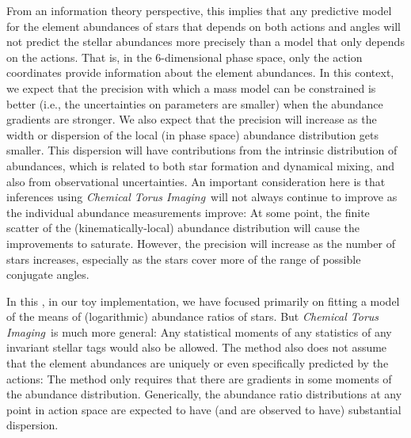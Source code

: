 \documentclass[modern]{aastex63}
\newcommand{\methodname}{\textsl{Chemical Torus Imaging}}
\begin{document}
From an information theory perspective, this implies that any predictive model
for the element abundances of stars that depends on both actions and angles will
not predict the stellar abundances more precisely than a model that only depends
on the actions.
That is, in the 6-dimensional phase space, only the action coordinates provide
information about the element abundances.
In this context, we expect that the precision with which a mass model can be
constrained is better (i.e., the uncertainties on parameters are smaller) when
the abundance gradients are stronger.
We also expect that the precision will increase as the width or dispersion of
the local (in phase space) abundance distribution gets smaller.
This dispersion will have contributions from the intrinsic distribution of
abundances, which is related to both star formation and dynamical mixing, and
also from observational uncertainties.
An important consideration here is that inferences using \methodname\ will not
always continue to improve as the individual abundance measurements improve:
At some point, the finite scatter of the (kinematically-local) abundance
distribution will cause the improvements to saturate.
However, the precision will increase as the number of stars increases,
especially as the stars cover more of the range of possible conjugate angles.

In this \documentname, in our toy implementation, we have focused primarily on
fitting a model of the means of (logarithmic) abundance ratios of stars.
But \methodname\ is much more general:
Any statistical moments of any statistics of any invariant stellar tags would
also be allowed.
The method also does not assume that the element abundances are uniquely or even
specifically predicted by the actions:
The method only requires that there are gradients in some moments of the
abundance distribution.
Generically, the abundance ratio distributions at any point in action space are
expected to have (and are observed to have) substantial dispersion.
\end{document}
